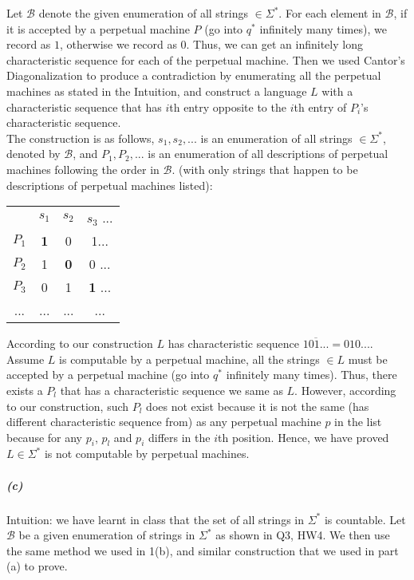 \documentclass[11pt]{article}
\begin{document}
Let $\mathcal{B}$ denote the given enumeration of all strings $\in \Sigma^*$. For each element in $\mathcal{B}$, if it is accepted by a perpetual machine $P$ (go into $q^*$ infinitely many times), we record as $1$, otherwise we record as $0$. Thus, we can get an infinitely long characteristic sequence for each of the perpetual machine. Then we used Cantor’s Diagonalization to produce a contradiction by enumerating all the perpetual machines as stated in the Intuition, and construct a language $L$ with a characteristic sequence that has $i$th entry opposite to the $i$th entry of $P_i$'s characteristic sequence.\\

The construction is as follows, $s_1,s_2,...$ is an enumeration of all strings $\in \Sigma^*$, denoted by $\mathcal{B}$, and $P_1, P_2, ...$ is an enumeration of all descriptions of perpetual machines following the order in $\mathcal{B}$. (with only strings that happen to be descriptions of perpetual machines listed):

\begin{center}
\begin{tabular}{ c c c c}
 	   & $s_1$ & $s_2$ & $s_3$ ...\\ 
 $P_1$ & \textbf{1} & 0 & 1...\\  
 $P_2$ & 1 & \textbf{0} & 0 ... \\
 $P_3$ & 0 & 1 & \textbf{1} ... \\
 ...& ...   & ...   & ...
\end{tabular}
\end{center}

According to our construction $L$ has characteristic sequence $\overline{101...} = 010...$. Assume $L$ is computable by a perpetual machine, all the strings $\in L$ must be accepted by a perpetual machine (go into $q^*$ infinitely many times). Thus, there exists a $P_l$ that has a characteristic sequence we same as $L$. However, according to our construction, such $P_l$ does not exist because it is not the same (has different characteristic sequence from) as any  perpetual machine $p$ in the list because for any $p_i$, $p_l$ and $p_i$ differs in the $i$th position. Hence, we have proved $L \in \Sigma^*$ is not computable by perpetual machines.
\newpage
\subparagraph{(c)}
Intuition: we have learnt in class that the set of all strings in $\Sigma^*$ is countable. Let $\mathcal{B}$ be a given enumeration of strings in $\Sigma^*$ as shown in Q3, HW4. We then use the same method we used in 1(b), and similar construction that we used in part (a) to prove. \\
\end{document}
